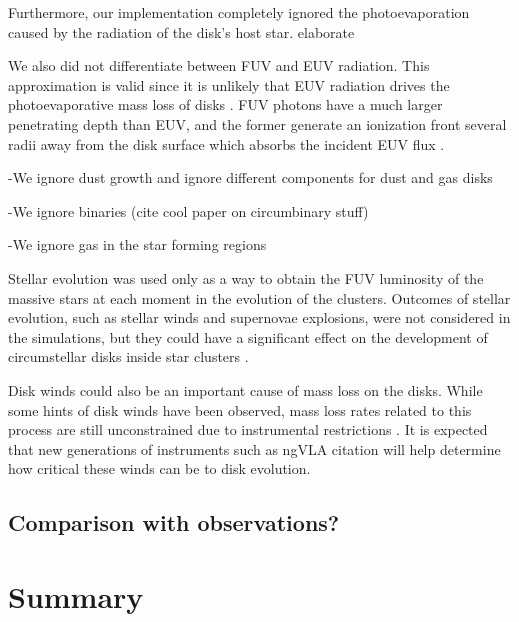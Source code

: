 \documentclass[fleqn,usenatbib]{mnras}
\newcommand\note[1]{{\colorbox{yellow!60}{\color{magenta}#1}}}
\begin{document}
Furthermore, our implementation completely ignored the photoevaporation caused by the radiation of the disk's host star. \note{elaborate} \citep{fatuzzo2008}

We also did not differentiate between FUV and EUV radiation. This approximation is valid since it is unlikely that EUV radiation drives the photoevaporative mass loss of disks \citep{owen2012}. FUV photons have a much larger penetrating depth than EUV, and the former generate an ionization front several radii away from the disk surface which absorbs the incident EUV flux \citep{adams2004}. 

-We ignore dust growth and ignore different components for dust and gas disks 

-We ignore binaries (cite cool paper on circumbinary stuff)

-We ignore gas in the star forming regions

Stellar evolution was used only as a way to obtain the FUV luminosity of the massive stars at each moment in the evolution of the clusters. Outcomes of stellar evolution, such as stellar winds and supernovae explosions, were not considered in the simulations, but they could have a significant effect on the development of circumstellar disks inside star clusters \citep{close2017,portegieszwart2018,pelupessy2012}.

Disk winds could also be an important cause of mass loss on the disks. While some hints of disk winds have been observed, mass loss rates related to this process are still unconstrained due to instrumental restrictions \citep{pascucci2018}. It is expected that new generations of instruments such as ngVLA \note{citation} will help determine how critical these winds can be to disk evolution.

\subsection{Comparison with observations?}

\section{Summary}
\label{sec:summary}


\bsp	%


\label{lastpage}
\end{document}
